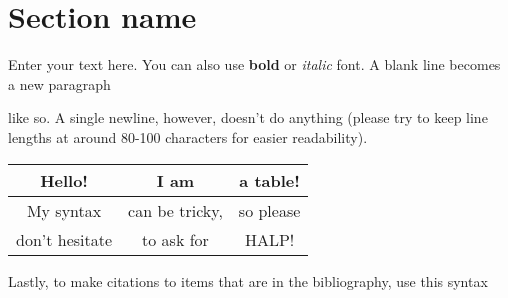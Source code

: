 \section{Section name} %
Enter your text here. You can also use {\bf bold} or {\em italic} font.
A blank line becomes a new paragraph

like so. A single newline, however, doesn't do anything (please try to keep
line lengths at around 80-100 characters for easier readability).

\begin{tabular}{|c|c|c|}
\hline
Hello! & I am & a table! \\ \hline
My syntax & can be tricky, & so please \\ \hline
don't hesitate & to ask for & HALP! \\ \hline
\end{tabular}

Lastly, to make citations to items that are in the bibliography, use
this syntax\cite{website:latex}
